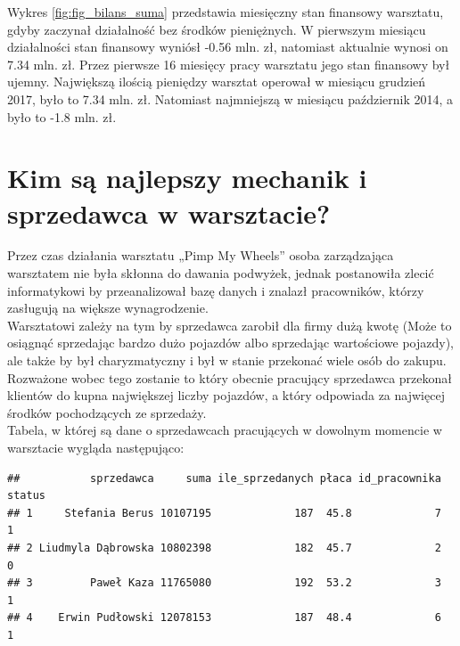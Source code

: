 \documentclass{article}\usepackage[]{graphicx}\usepackage[]{xcolor}
\makeatletter
\newenvironment{kframe}{%
 \def\at@end@of@kframe{}%
 \ifinner\ifhmode%
  \def\at@end@of@kframe{\end{minipage}}%
  \begin{minipage}{\columnwidth}%
 \fi\fi%
 \def\FrameCommand##1{\hskip\@totalleftmargin \hskip-\fboxsep
 \colorbox{shadecolor}{##1}\hskip-\fboxsep
     \hskip-\linewidth \hskip-\@totalleftmargin \hskip\columnwidth}%
 \MakeFramed {\advance\hsize-\width
   \@totalleftmargin\z@ \linewidth\hsize
   \@setminipage}}%
 {\par\unskip\endMakeFramed%
 \at@end@of@kframe}
\newenvironment{knitrout}{}{} %
\makeatother
\begin{document}
Wykres \ref{fig:fig_bilans_suma} przedstawia miesięczny stan finansowy warsztatu, gdyby zaczynał działalność bez środków pieniężnych. W pierwszym miesiącu działalności stan finansowy wyniósł -0.56 mln. zł, natomiast aktualnie wynosi on 7.34 mln. zł. Przez pierwsze 16 miesięcy pracy warsztatu jego stan finansowy był ujemny.
Największą ilością pieniędzy warsztat operował w miesiącu grudzień 2017, było to 7.34 mln. zł.
Natomiast najmniejszą w miesiącu październik 2014, a było to -1.8 mln. zł.

\section{Kim są najlepszy mechanik i sprzedawca w warsztacie?}

Przez czas działania warsztatu „Pimp My Wheels” osoba zarządzająca warsztatem nie była skłonna do dawania podwyżek, jednak postanowiła zlecić informatykowi by przeanalizował bazę danych i znalazł pracowników, którzy zasługują na większe wynagrodzenie. \\

Warsztatowi zależy na tym by sprzedawca zarobił dla firmy dużą kwotę (Może to osiągnąć sprzedając bardzo dużo pojazdów albo sprzedając wartościowe pojazdy), ale także by był charyzmatyczny i był w stanie przekonać wiele osób do zakupu. Rozważone wobec tego zostanie to który obecnie pracujący sprzedawca przekonał klientów do kupna największej liczby pojazdów, a który odpowiada za najwięcej środków pochodzących ze sprzedaży. \\


Tabela, w której są dane o sprzedawcach  pracujących w dowolnym momencie w warsztacie wygląda następująco:

\begin{knitrout}
\color{fgcolor}\begin{kframe}
\begin{verbatim}
##           sprzedawca     suma ile_sprzedanych płaca id_pracownika status
## 1     Stefania Berus 10107195             187  45.8             7      1
## 2 Liudmyla Dąbrowska 10802398             182  45.7             2      0
## 3         Paweł Kaza 11765080             192  53.2             3      1
## 4    Erwin Pudłowski 12078153             187  48.4             6      1
\end{verbatim}
\end{kframe}
\end{knitrout}
\end{document}
